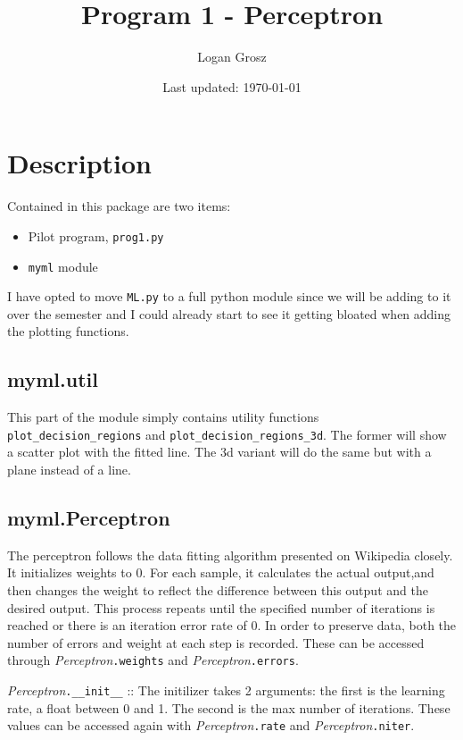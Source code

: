 \documentclass{article}
\title{Program 1 - Perceptron}
\author{Logan Grosz}
\date{Last updated: \today}
\begin{document}
\maketitle

\section{Description}

Contained in this package are two items:

\begin{itemize}
    \item Pilot program, \texttt{prog1.py}    
    \item \texttt{myml} module
\end{itemize}

I have opted to move \texttt{ML.py} to a full python module since we will be
adding to it over the semester and I could already start to see it getting
bloated when adding the plotting functions.

\subsection{myml.util}

This part of the module simply contains utility functions
\texttt{plot\_decision\_regions} and \texttt{plot\_decision\_regions\_3d}. The
former will show a scatter plot with the fitted line. The 3d variant will do the
same but with a plane instead of a line.

\subsection{myml.Perceptron}

The perceptron follows the data fitting algorithm presented on Wikipedia
closely. It initializes weights to 0. For each sample, it calculates the actual
output,and then changes the weight to reflect the difference between this output
and the desired output. This process repeats until the specified number of
iterations is reached or there is an iteration error rate of 0. In order to
preserve data, both the number of errors and weight at each step is recorded.
These can be accessed through \textit{Perceptron}\texttt{.weights} and
\textit{Perceptron}\texttt{.errors}.

\textit{Perceptron}\texttt{.\_\_init\_\_} :: The initilizer takes 2 arguments: the
first is the learning rate, a float between 0 and 1. The second is the max
number of iterations. These values can be accessed again with
\textit{Perceptron}\texttt{.rate} and \textit{Perceptron}\texttt{.niter}.
\end{document}
